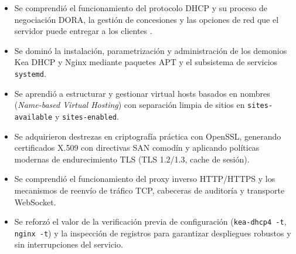 \begin{itemize}
  \item Se comprendió el funcionamiento del protocolo DHCP y su proceso de
        negociación DORA, la gestión de concesiones y las opciones de red que
        el servidor puede entregar a los clientes \cite{rfc2131}.
  \item Se dominó la instalación, parametrización y administración de los
        demonios Kea DHCP y Nginx mediante paquetes APT y el subsistema de
        servicios \texttt{systemd}.
  \item Se aprendió a estructurar y gestionar virtual hosts basados en nombres
        (\textit{Name-based Virtual Hosting}) con separación limpia de sitios en
        \texttt{sites-available} y \texttt{sites-enabled}.
  \item Se adquirieron destrezas en criptografía práctica con OpenSSL,
        generando certificados X.509 con directivas SAN comodín y aplicando
        políticas modernas de endurecimiento TLS (TLS 1.2/1.3, cache de sesión).
  \item Se comprendió el funcionamiento del proxy inverso HTTP/HTTPS y los
        mecanismos de reenvío de tráfico TCP, cabeceras de auditoría y
        transporte WebSocket.
  \item Se reforzó el valor de la verificación previa de configuración
        (\texttt{kea-dhcp4 -t}, \texttt{nginx -t}) y la inspección de registros
        para garantizar despliegues robustos y sin interrupciones del servicio.
\end{itemize}